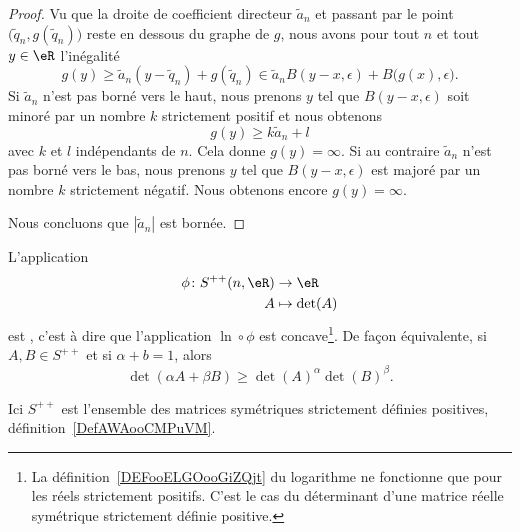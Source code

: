 \begin{proof}
    Vu que la droite de coefficient directeur \( \tilde a_n\) et passant par le point \( \big( \tilde q_n,g(\tilde q_n) \big)\) reste en dessous du graphe de \( g\), nous avons pour tout \( n\) et tout \( y\in \eR\) l'inégalité
    \begin{equation}
        g(y)\geq \tilde a_n(y-\tilde q_n)+g(\tilde q_n)\in \tilde a_nB(y-x,\epsilon)+B\big( g(x),\epsilon \big).
    \end{equation}
    Si \( \tilde a_n\) n'est pas borné vers le haut, nous prenons \( y\) tel que \( B(y-x,\epsilon)\) soit minoré par un nombre \( k\) strictement positif et nous obtenons
    \begin{equation}
        g(y)\geq k\tilde a_n+l
    \end{equation}
    avec \( k\) et \( l\) indépendants de \( n\). Cela donne \( g(y)=\infty\). Si au contraire \( \tilde a_n\) n'est pas borné vers le bas, nous prenons $y$ tel que \( B(y-x,\epsilon)\) est majoré par un nombre \( k\) strictement négatif. Nous obtenons encore \( g(y)=\infty\).

    Nous concluons que \( | \tilde a_n |\) est bornée.
\end{proof}

\begin{lemma}   \label{LemXOUooQsigHs}
    L'application
    \begin{equation}
        \begin{aligned}
            \phi\colon S^{++}(n,\eR)&\to \eR \\
            A&\mapsto \det(A)
        \end{aligned}
    \end{equation}
    est , c'est à dire que l'application \( \ln\circ\phi\) est concave\footnote{La définition~\ref{DEFooELGOooGiZQjt} du logarithme ne fonctionne que pour les réels strictement positifs. C'est le cas du déterminant d'une matrice réelle symétrique strictement définie positive.}. De façon équivalente, si \( A,B\in S^{++}\) et si \( \alpha+b=1\), alors
    \begin{equation}    \label{EqSPKooHFZvmB}
        \det(\alpha A+\beta B)\geq \det(A)^{\alpha}\det(B)^{\beta}.
    \end{equation}
\end{lemma}
Ici \( S^{++}\) est l'ensemble des matrices symétriques strictement définies positives, définition~\ref{DefAWAooCMPuVM}.

